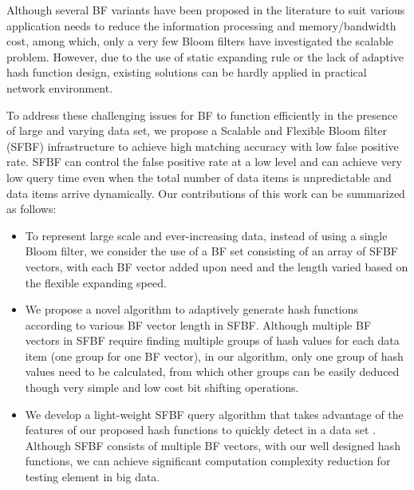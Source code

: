 \documentclass[10pt,journal,letterpaper]{IEEEtran}
\newcommand{\rev}[1]{\uwave{#1}}
\newcommand{\note}[1]{{\sffamily\itshape\bfseries\uline{#1}}}
\begin{document}
Although several BF variants \cite{6848046,fan2000summary,mitzenmacher2002compressed,kumar2006space,deng2006approximately,dutta2012towards,dutta2013streaming,yoon2010aging,tree6848077,guo2006theory, xie2007scalable} have been proposed in the literature to suit
various application needs to reduce the information processing and memory/bandwidth cost,
among which, only a very few Bloom filters \cite{guo2006theory, wei2010mad2,almeida2007scalable,xie2007scalable} have investigated the scalable problem. However, due to the use of static expanding rule or the lack of adaptive hash function design, existing solutions can be hardly  applied in practical network environment.

To address these challenging issues for BF to function efficiently in the presence of large and varying data set, we propose a Scalable and Flexible Bloom filter (SFBF) infrastructure to achieve high matching accuracy with low false positive rate. SFBF can control the false positive rate at a low level and can achieve very low query time even when the total number of data items is unpredictable and data items arrive dynamically. Our contributions of this work can be summarized as follows:
\begin{itemize}
  \item To represent large scale and ever-increasing data, instead of using a single Bloom filter, we consider the use of a BF set consisting of an array of SFBF vectors, with each BF vector added upon need and the length varied based on the flexible expanding speed.
  \item We propose a novel algorithm to adaptively generate hash functions according to various BF vector length in SFBF. Although multiple BF vectors in SFBF require finding multiple groups of hash values for each data item (one group for one BF vector), in our algorithm, only one group of hash values need to be calculated, from which other groups can be easily deduced though very simple and low cost bit shifting operations.
  \item We develop a light-weight SFBF query algorithm that takes advantage of the features of our proposed hash functions to quickly detect \rev{whether an element is} in a data set \rev{or not}. Although SFBF consists of multiple BF vectors, with our well designed hash functions, we can achieve significant computation complexity reduction for testing element in big data.
\end{itemize}

\end{document}
